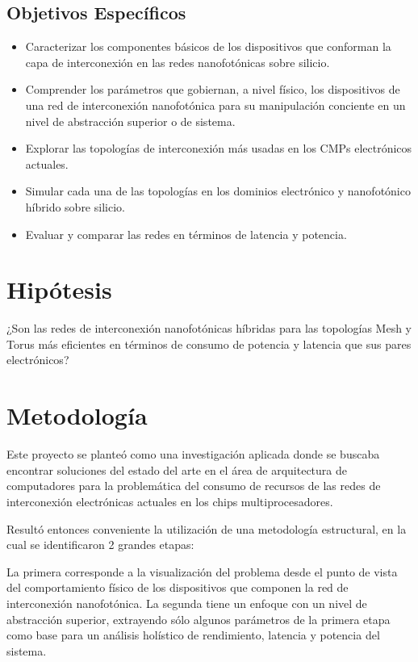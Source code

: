 \subsection{Objetivos Específicos}
\begin{itemize}
\item Caracterizar los componentes básicos de los dispositivos que conforman la
capa de interconexión en las redes nanofotónicas sobre silicio.
\item Comprender los parámetros que gobiernan, a nivel físico, los dispositivos 
de una red de interconexión nanofotónica para su manipulación conciente en
 un nivel de abstracción superior o de sistema.
\item Explorar las topologías de interconexión más usadas en los CMPs electrónicos actuales.
\item Simular cada una de las topologías en los dominios electrónico y nanofotónico híbrido sobre silicio.
\item Evaluar y comparar las redes en términos de latencia y potencia.
\end{itemize} 

\section{Hipótesis}
¿Son las redes de interconexión nanofotónicas híbridas para las
topologías Mesh y Torus más eficientes en términos de consumo de potencia
 y latencia que sus pares electrónicos?

\section{Metodología}
Este proyecto se planteó como una investigación aplicada donde se buscaba 
encontrar soluciones del estado del arte en el área de arquitectura de 
computadores para la problemática del consumo de recursos de las redes de 
interconexión electrónicas actuales en los chips multiprocesadores. 

Resultó entonces conveniente la utilización de una metodología estructural, 
en la cual se identificaron 2 grandes etapas: 

La primera corresponde
a la visualización del problema desde el punto de vista del comportamiento físico de
los dispositivos que componen la red de interconexión nanofotónica. 
La segunda tiene un enfoque con un nivel de abstracción superior, extrayendo
sólo algunos parámetros de la primera etapa como base para un análisis holístico de rendimiento,
latencia y potencia del sistema.

